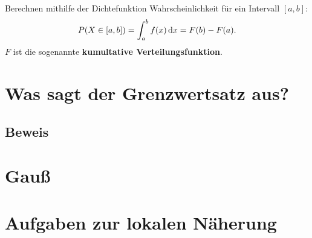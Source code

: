 \documentclass[14pt]{beamer}
\begin{document}
\begin{frame}{Berechnen mithilfe der Dichtefunktion}
Wahrscheinlichkeit für ein Intervall $[a,b]$:
$$P(X\in [a,b]) = \int_a^b f(x)\, {\rm d}x = F(b)-F(a).$$
$F$ ist die sogenannte \textbf{kumultative Verteilungsfunktion}.
\end{frame}




\section{Was sagt der Grenzwertsatz aus?} %
\subsection{Beweis} %
\section{Gauß} %
\section{Aufgaben zur lokalen Näherung}
\end{document}
